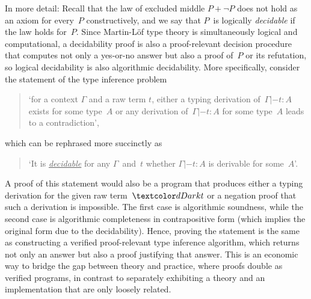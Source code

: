 In more detail:
Recall that the law of excluded middle $P + \neg P$ does not hold as an axiom for every~$P$ constructively, and we say that $P$~is logically \emph{decidable} if the law holds for~$P$.
Since Martin-L\"of type theory is simultaneously logical and computational, a decidability proof is also a proof-relevant decision procedure that computes not only a yes-or-no answer but also a proof of~$P$ or its refutation, so logical decidability is also algorithmic decidability.
More specifically, consider the statement of the type inference problem
\begin{quote}
  `for a context $\Gamma$ and a raw term $t$, either a typing derivation of\, $\Gamma |- t : A$ exists for some type~$A$ or any derivation of\, $\Gamma |- t : A$ for some type~$A$ leads to a contradiction',
\end{quote}
which can be rephrased more succinctly as
\begin{quote}
  `It is \underline{\emph{decidable}} for any $\Gamma$~and~$t$ whether $\Gamma |- t : A$ is derivable for some~$A$'.
\end{quote}
A proof of this statement would also be a program that produces either a typing derivation for the given raw term~$\isTerm{t}$ or a negation proof that such a derivation is impossible.
The first case is algorithmic soundness, while the second case is algorithmic completeness in contrapositive form (which implies the original form due to the decidability).
Hence, proving the statement is the same as constructing a verified proof-relevant type inference algorithm, which returns not only an answer but also a proof justifying that answer.
This is an economic way to bridge the gap between theory and practice, where proofs double as verified programs, in contrast to separately exhibiting a theory and an implementation that are only loosely related.



